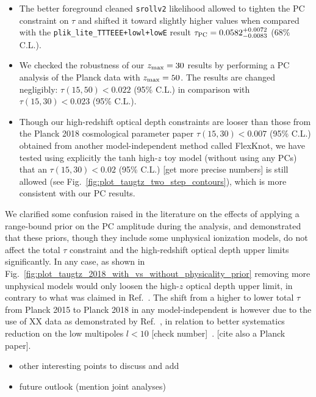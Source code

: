 \documentclass[prd,twocolumn,amsmath,amssymb,floatfix,superscriptaddress,nofootinbib]{revtex4-1}
\newcommand{\zmax}{z_{\rm max}}
\begin{document}
{\begin{itemize}
    \item {The better foreground cleaned \texttt{srollv2} likelihood allowed to tighten the PC constraint on $\tau$ and shifted it toward slightly higher values when compared with the \texttt{plik\_lite\_TTTEEE+lowl+lowE} result  $\tau_{\rm PC} = 0.0582 ^{+0.0072}_{-0.0083}$ (68\% C.L.).}
    
    \item {We checked the robustness of our $\zmax=30$ results by performing a PC analysis of the Planck data with $\zmax = 50$. The results are changed negligibly: $\tau(15, 50) < 0.022 $ (95\% C.L.) in comparison with $\tau(15, 30) < 0.023$ (95\% C.L.).}
    
     \item {Though our high-redshift optical depth constraints are looser than those from the Planck 2018 cosmological parameter paper $\tau(15, 30) < 0.007$ (95\% C.L.) obtained from another model-independent method called FlexKnot, we have tested using explicitly the tanh high-$z$ toy model (without using any PCs) that an $\tau(15, 30) < 0.02$ (95\% C.L.) [get more precise numbers] is still allowed (see Fig.~\ref{fig:plot_taugtz_two_step_contours}), which is more consistent with our PC results.}
     
\end{itemize}

We clarified some confusion raised in the literature on the effects of applying a range-bound prior on the PC amplitude during the analysis, and demonstrated that these priors, though they include some unphysical ionization models, do not affect the total $\tau$ constraint and the high-redshift optical depth upper limits significantly. In any case, as shown in Fig.~\ref{fig:plot_taugtz_2018_with_vs_without_physicality_prior} removing more unphysical models would only loosen the high-$z$ optical depth upper limit, in contrary to what was claimed in Ref.~\cite{Millea:2018bko}. The shift from a higher to lower total $\tau$ from Planck 2015 to Planck 2018 in any model-independent is however due to the use of XX data as demonstrated by Ref.~\cite{Millea:2018bko}, in relation to better systematics reduction on the low multipoles $l<10$ [check number]~\cite{Heinrich:2018btc}. [cite also a Planck paper].

\begin{itemize}
    \item other interesting points to discuss and add 
    \item future outlook (mention joint analyses)
\end{itemize}

}
\end{document}
